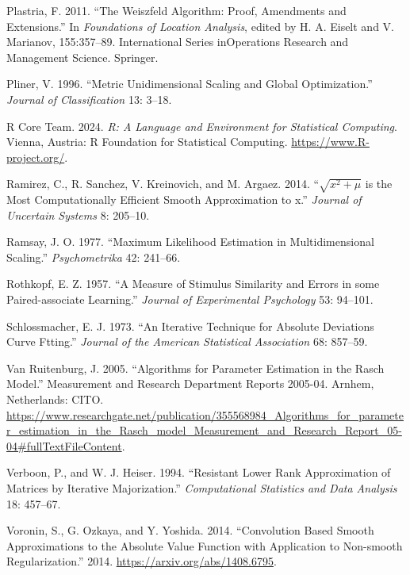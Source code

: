 \documentclass[
  12pt,
  letterpaper,
  DIV=11,
  numbers=noendperiod]{scrartcl}
\newlength{\cslhangindent}
\newenvironment{CSLReferences}[2] %
 {\begin{list}{}{%
  \setlength{\itemindent}{0pt}
  \setlength{\leftmargin}{0pt}
  \setlength{\parsep}{0pt}
  \ifodd #1
   \setlength{\leftmargin}{\cslhangindent}
   \setlength{\itemindent}{-1\cslhangindent}
  \fi
  \setlength{\itemsep}{#2\baselineskip}}}
 {\end{list}}
\theoremstyle{definition}
\theoremstyle{plain}
\theoremstyle{plain}
\theoremstyle{remark}
\begin{document}
\begin{CSLReferences}{1}{0}
Plastria, F. 2011. {``The Weiszfeld Algorithm: Proof, Amendments and
Extensions.''} In \emph{Foundations of Location Analysis}, edited by H.
A. Eiselt and V. Marianov, 155:357--89. International Series
inOperations Research and Management Science. Springer.

Pliner, V. 1996. {``{Metric Unidimensional Scaling and Global
Optimization}.''} \emph{Journal of Classification} 13: 3--18.

R Core Team. 2024. \emph{R: A Language and Environment for Statistical
Computing}. {Vienna, Austria}: R Foundation for Statistical Computing.
\url{https://www.R-project.org/}.

Ramirez, C., R. Sanchez, V. Kreinovich, and M. Argaez. 2014.
{``{\(\sqrt{x^2+\mu}\) is the Most Computationally Efficient Smooth
Approximation to \vert{}x\vert{}}.''} \emph{Journal of Uncertain
Systems} 8: 205--10.

Ramsay, J. O. 1977. {``{Maximum Likelihood Estimation in
Multidimensional Scaling}.''} \emph{Psychometrika} 42: 241--66.

Rothkopf, E. Z. 1957. {``{A Measure of Stimulus Similarity and Errors in
some Paired-associate Learning}.''} \emph{Journal of Experimental
Psychology} 53: 94--101.

Schlossmacher, E. J. 1973. {``An Iterative Technique for Absolute
Deviations Curve Ftting.''} \emph{Journal of the American Statistical
Association} 68: 857--59.

Van Ruitenburg, J. 2005. {``{Algorithms for Parameter Estimation in the
Rasch Model}.''} Measurement and Research Department Reports 2005-04.
Arnhem, Netherlands: CITO.
\url{https://www.researchgate.net/publication/355568984_Algorithms_for_parameter_estimation_in_the_Rasch_model_Measurement_and_Research_Report_05-04\#fullTextFileContent}.

Verboon, P., and W. J. Heiser. 1994. {``{Resistant Lower Rank
Approximation of Matrices by Iterative Majorization}.''}
\emph{Computational Statistics and Data Analysis} 18: 457--67.

Voronin, S., G. Ozkaya, and Y. Yoshida. 2014. {``{Convolution Based
Smooth Approximations to the Absolute Value Function with Application to
Non-smooth Regularization}.''} 2014.
\url{https://arxiv.org/abs/1408.6795}.


\end{CSLReferences}
\end{document}
